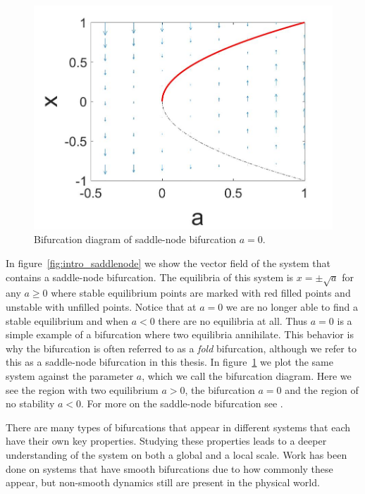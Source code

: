 \begin{figure}[H]
\centering
\includegraphics[width=.7\linewidth]{intro/saddlenode_bif_diagram.jpg}
\caption{Bifurcation diagram of saddle-node bifurcation $a=0$.}
\label{fig:intro_saddlenode_bif_diagram}
\end{figure}

\indent In figure~\ref{fig:intro_saddlenode} we show the vector field of the system that contains a saddle-node bifurcation. The equilibria of this system is $x=\pm \sqrt{a}$ for any $a\ge0$ where stable equilibrium points are marked with red filled points and unstable with unfilled points. Notice that at $a=0$ we are no longer able to find a stable equilibrium and when $a<0$ there are no equilibria at all. Thus $a=0$ is a simple example of a bifurcation where two equilibria annihilate. This behavior is why the bifurcation is often referred to as a \textit{fold} bifurcation, although we refer to this as a saddle-node bifurcation in this thesis. In figure~\ref{fig:intro_saddlenode_bif_diagram} we plot the same system against the parameter $a$, which we call the bifurcation diagram. Here we see the region with two equilibrium $a>0$, the bifurcation $a=0$ and the region of no stability $a<0$. For more on the saddle-node bifurcation see \cite{kuznetsov2006saddle}.

\indent There are many types of bifurcations that appear in different systems that each have their own key properties. Studying these properties leads to a deeper understanding of the system on both a global and a local scale. Work has been done on systems that have smooth bifurcations due to how commonly these appear, but non-smooth dynamics still are present in the physical world.

